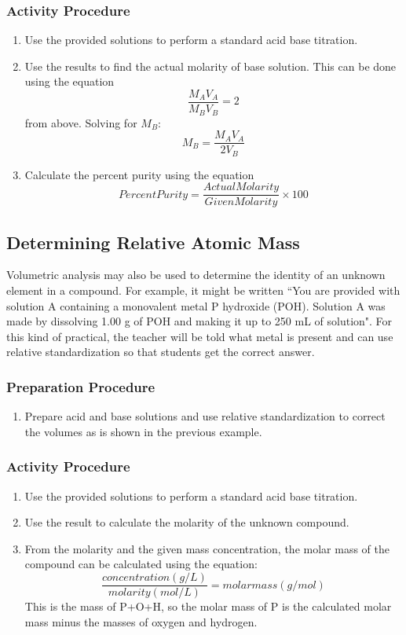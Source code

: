 \subsubsection{Activity Procedure}
\begin{enumerate}
\item {Use the provided solutions to perform a standard acid base titration.}
\item{Use the results to find the actual molarity of base solution. This can be done using the equation 
$$\frac{M_A V_A}{M_B V_B}=2$$
from above. Solving for $M_B$:
$$M_B=\frac{M_A V_A}{2V_B}$$}
\item {Calculate the percent purity using the equation
$$Percent Purity = \frac{Actual  Molarity}{Given  Molarity}\times 100$$}
\end{enumerate}


\subsection{Determining Relative Atomic Mass}

Volumetric analysis may also be used to determine the identity of an unknown element in a compound. For example, it might be written ``You are provided with solution A containing a monovalent metal P hydroxide (POH). Solution A was made by dissolving 1.00 g of POH and making it up to 250 mL of solution". For this kind of practical, the teacher will be told what metal is present and can use relative standardization so that students get the correct answer.

\subsubsection{Preparation Procedure}
\begin{enumerate}
\item{Prepare acid and base solutions and use relative standardization to correct the volumes as is shown in the previous example.}
\end{enumerate}
\subsubsection{Activity Procedure}
\begin{enumerate}
\item{Use the provided solutions to perform a standard acid base titration.}
\item{Use the result to calculate the molarity of the unknown compound.}
\item{ From the molarity and the given mass concentration, the molar mass of the compound can be calculated using the equation: 
$$\frac{concentration(g/L)}{molarity(mol/L)}={molar mass(g/mol)}$$
This is the mass of P+O+H, so the molar mass of P is the calculated molar mass minus the masses of oxygen and hydrogen.}
\end{enumerate}


